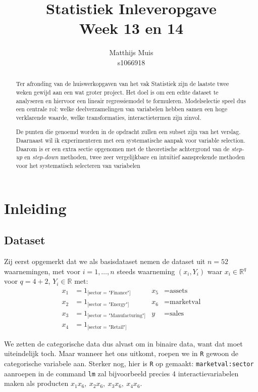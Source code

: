 \documentclass[a4paper, notitlepage]{report}
\author{
	Matthijs Muis \\
	s1066918
}
\title{
	Statistiek Inleveropgave \\
	Week 13 en 14
}
\begin{document}
\maketitle
\begin{abstract}
  Ter afronding van de huiswerkopgaven van het vak Statistiek zijn de laatste twee weken gewijd aan een wat groter project. Het doel is om een echte dataset te analyseren en hiervoor een lineair regressiemodel te formuleren. Modelselectie speel dus een centrale rol: welke deelverzamelingen van variabelen hebben samen een hoge verklarende waarde, welke transformaties, interactietermen zijn zinvol.
  
  De punten die genoemd worden in de opdracht zullen een subset zijn van het verslag. Daarnaast wil ik experimenteren met een systematische aanpak voor variable selection. Daarom is er een extra sectie opgenomen met de theoretische achtergrond van de \emph{step-up} en \emph{step-down} methoden, twee zeer vergelijkbare en intu\"itief aansprekende methoden voor het systematisch selecteren van variabelen
\end{abstract}
\clearpage
\tableofcontents
\clearpage

\chapter{Inleiding}  
\section{Dataset}
  Zij eerst opgemerkt dat we als basisdataset nemen de dataset uit $n = 52$ waarnemingen, met voor $i = 1, \dots ,n$ steeds waarneming $(x_i,Y_i)$ waar $x_i \in \mathbb{R}^q$ voor $q = 4 + 2$, $Y_i \in \mathbb{R}$ met:
  \begin{align*}
  x_1 &= 1_{\text{[sector = "Finance"]}} &
  x_5 &= \text{assets} \\
  x_2 &= 1_{\text{[sector = "Energy"]}} &
  x_6 &= \text{marketval} \\
  x_3 &= 1_{\text{[sector = "Manufacturing"]}} &
  y &= \text{sales} \\
  x_4 &= 1_{\text{[sector = "Retail"]}}
  \end{align*}
  
  We zetten de categorische data dus alvast om in binaire data, want dat moet uiteindelijk toch. Maar wanneer het ons uitkomt, roepen we in \verb!R! gewoon de categorische variabele aan. Sterker nog, hier is \verb!R! op gemaakt: \verb!marketval:sector! aanroepen in de command \verb!lm! zal bijvoorbeeld precies 4 interactievariabelen maken als producten $x_1x_6, \ x_2x_6, \ x_3x_6, \ x_4x_6$.
  
\end{document}
